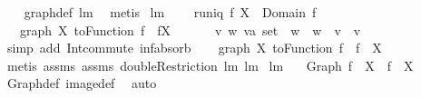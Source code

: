\begin{isabellebody}
%
\isadelimproof
\ \ %
\endisadelimproof
%
\isatagproof
{}\isamarkupfalse%
\ graph{\isacharunderscore}def\ lm{}{}{}\ \isamarkupfalse%
\ metis%
\endisatagproof
{\isafoldproof}%
%
\isadelimproof
\isanewline
%
\endisadelimproof
\isanewline
{}\isamarkupfalse%
\ lm{}{}{}{\isacharcolon}\ \isanewline
\ \ \ {\isachardoublequoteopen}runiq\ f{\isachardoublequoteclose}\ {\isachardoublequoteopen}X\ {\isasymsubseteq}\ Domain\ f{\isachardoublequoteclose}\ \isanewline
\ \ \ {\isachardoublequoteopen}graph\ X\ {\isacharparenleft}toFunction\ f{\isacharparenright}\ {\isacharequal}\ {\isacharparenleft}f{\isacharbar}{\isacharbar}X{\isacharparenright}{\isachardoublequoteclose}\ \isanewline
%
\isadelimproof
%
\endisadelimproof
%
\isatagproof
{}\isamarkupfalse%
\ {\isacharminus}\isanewline
\ \ \isamarkupfalse%
\ {\isachardoublequoteopen}{\isasymAnd}v\ w{\isachardot}\ {\isacharparenleft}v{\isasymColon}{\isacharprime}a\ set{\isacharparenright}\ {\isasymsubseteq}\ w\ {\isasymlongrightarrow}\ w\ {\isasyminter}\ v\ {\isacharequal}\ v{\isachardoublequoteclose}\ \isamarkupfalse%
\ {\isacharparenleft}simp\ add{\isacharcolon}\ Int{\isacharunderscore}commute\ inf{\isachardot}absorb{}{\isacharparenright}\isanewline
\ \ \isamarkupfalse%
\ {\isachardoublequoteopen}graph\ X\ {\isacharparenleft}toFunction\ f{\isacharparenright}\ {\isacharequal}\ f\ {\isacharbar}{\isacharbar}\ X{\isachardoublequoteclose}\ \isamarkupfalse%
\ {\isacharparenleft}metis\ assms{\isacharparenleft}{}{\isacharparenright}\ assms{\isacharparenleft}{}{\isacharparenright}\ doubleRestriction\ lm{}{}{}\ lm{}{}{}{\isacharparenright}\isanewline
{}\isamarkupfalse%
%
\endisatagproof
{\isafoldproof}%
%
\isadelimproof
\isanewline
%
\endisadelimproof
\isanewline
{}\isamarkupfalse%
\ lm{}{}{}{\isacharcolon}\ \isanewline
\ \ {\isachardoublequoteopen}{\isacharparenleft}Graph\ f{\isacharparenright}\ {\isacharbackquote}{\isacharbackquote}\ X\ {\isacharequal}\ f\ {\isacharbackquote}\ X{\isachardoublequoteclose}\ \isanewline
%
\isadelimproof
\ \ %
\endisadelimproof
%
\isatagproof
{}\isamarkupfalse%
\ Graph{\isacharunderscore}def\ image{\isacharunderscore}def\ \isamarkupfalse%
\ auto%
\endisatagproof
{\isafoldproof}%

\end{isabellebody}
